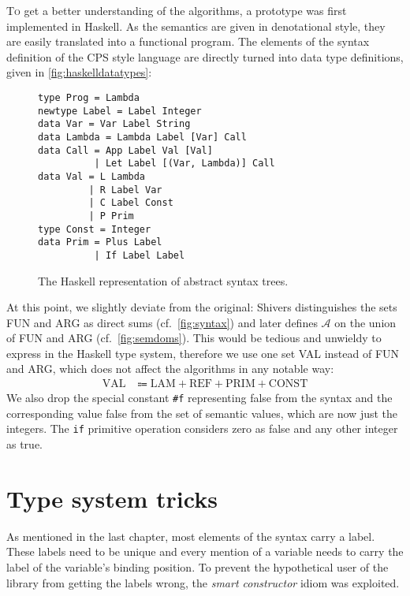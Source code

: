 \documentclass[a4paper,halfparskip,DIV=10,11pt]{scrbook}
\newcommand{\A}{\mathcal A}
\begin{document}
\lettrine T{o} get a better understanding of the algorithms, a prototype was first implemented in Haskell. As the semantics are given in denotational style, they are easily translated into a functional program. The elements of the syntax definition of the CPS style language are directly turned into data type definitions, given in \vref{fig:haskelldatatypes}:

\begin{figure}
\begin{framed}
\begin{lstlisting}
type Prog = Lambda
newtype Label = Label Integer
data Var = Var Label String
data Lambda = Lambda Label [Var] Call
data Call = App Label Val [Val]
          | Let Label [(Var, Lambda)] Call
data Val = L Lambda
         | R Label Var
         | C Label Const
         | P Prim
type Const = Integer
data Prim = Plus Label
          | If Label Label 
\end{lstlisting}
\end{framed}
\caption{The Haskell representation of abstract syntax trees.}
\label{fig:haskelldatatypes}
\end{figure}


At this point, we slightly deviate from the original: Shivers distinguishes the sets FUN and ARG as direct sums (cf.\ \vref{fig:syntax}) and later defines $\A$ on the union of FUN and ARG (cf.\ \vref{fig:semdoms}). This would be tedious and unwieldy to express in the Haskell type system, therefore we use one set VAL instead of FUN and ARG, which does not affect the algorithms in any notable way:
\begin{align*}
\text{VAL} &\Coloneqq \text{LAM} + \text{REF} + \text{PRIM} + \text{CONST}
\end{align*}
We also drop the special constant \texttt{\#f} representing false from the syntax and the corresponding value false from the set of semantic values, which are now just the integers. The \texttt{if} primitive operation considers zero as false and any other integer as true.

\section{Type system tricks}

As mentioned in the last chapter, most elements of the syntax carry a label. These labels need to be unique and every mention of a variable needs to carry the label of the variable’s binding position. To prevent the hypothetical user of the library from getting the labels wrong, the \textit{smart constructor} idiom was exploited.
\end{document}
